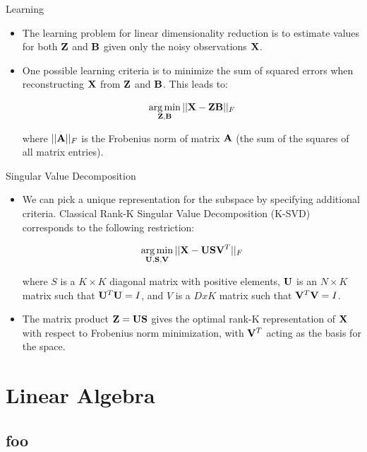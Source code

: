 \documentclass[serif,xcolor=pdftex,dvipsnames,table,hyperref={bookmarks=false,breaklinks}]{beamer}
\begin{document}
\begin{frame}[t]{Learning}
 
\begin{itemize}
\item The learning problem for linear dimensionality reduction is to estimate
values for both ${\mathbf{Z}}$ and ${\mathbf{B}}$ given only the noisy observations 
${\mathbf{X}}$.

\item One possible learning criteria is to minimize the sum of squared 
errors when reconstructing ${\mathbf{X}}$ from ${\mathbf{Z}}$ and ${\mathbf{B}}$. This leads 
to:

{\Large
$$\operatorname*{arg\,min}_{{\mathbf{Z}},{\mathbf{B}}} ||{\mathbf{X}} - {\mathbf{Z}}{\mathbf{B}} ||_F$$
}

where $||{\mathbf{A}}||_F$ is the Frobenius norm of matrix  ${\mathbf{A}}$ (the sum of 
the squares of all matrix entries). 

\end{itemize} 
\end{frame}

\begin{frame}[t]{Singular Value Decomposition}
 
\begin{itemize}

\item We can pick a unique representation for the subspace by 
specifying additional criteria. Classical Rank-K Singular Value Decomposition 
(K-SVD) corresponds to the following restriction:

$$\operatorname*{arg\,min}_{{\mathbf{U}},{\mathbf{S}},{\mathbf{V}}} ||{\mathbf{X}} - {\mathbf{U}}{\mathbf{S}}{\mathbf{V}}^T ||_F$$

where $S$ is a $K\times K$ diagonal matrix with positive elements,  
${\mathbf{U}}$ is an $N\times K$ matrix such that  ${\mathbf{U}}^T{\mathbf{U}}=I$, and $V$
is a $DxK$ matrix such that ${\mathbf{V}}^T{\mathbf{V}}=I$.

\pause\item The matrix product ${\mathbf{Z}}={\mathbf{U}}{\mathbf{S}}$ gives the optimal 
rank-K representation of ${\mathbf{X}}$ with respect to Frobenius norm minimization,
with ${\mathbf{V}}^T$ acting as the basis for the space.

\end{itemize} 
\end{frame}

\section{Linear Algebra}
\subsection{foo}
\end{document}
